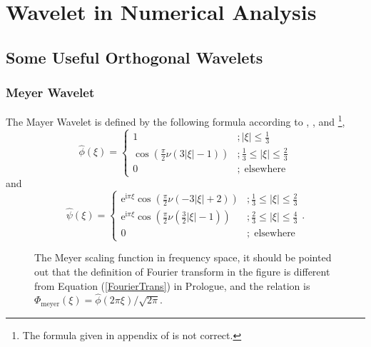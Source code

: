 \documentclass{book}
\newcommand{\mathe}{\mathrm{e}}
\newcommand{\mathi}{\mathrm{i}}
\newcommand{\mathpi}{\pi}
\newcommand{\tmop}[1]{\ensuremath{\operatorname{#1}}}
\begin{document}
\chapter{Wavelet in Numerical Analysis}

\section{Some Useful Orthogonal Wavelets}

\subsection{Meyer Wavelet}

The Mayer Wavelet is defined by the following formula according to
{\cite{frohlich1993adaptive}}, {\cite{daubechies1992ten}}, and
{\cite{vermehren2015close}}\footnote{The formula given in appendix of
{\cite{frohlich1993adaptive}} is not correct.},
\[ \hat{\phi} (\xi) = \left\{ \begin{array}{ll}
     1 & ; | \xi | \leqslant \frac{1}{3}\\
     \cos \left( \frac{\mathpi}{2} \nu (3 | \xi | - 1) \right) & ; \frac{1}{3}
     \leqslant | \xi | \leqslant \frac{2}{3}\\
     0 & ; \tmop{elsewhere}
   \end{array} \right. \]
and
\[ \hat{\psi} (\xi) = \left\{ \begin{array}{ll}
     \mathe^{\mathi \mathpi \xi} \cos \left( \frac{\mathpi}{2} \nu (- 3 | \xi
     | + 2) \right) & ; \frac{1}{3} \leqslant | \xi | \leqslant \frac{2}{3}\\
     \mathe^{\mathi \mathpi \xi} \cos \left( \frac{\mathpi}{2} \nu \left(
     \frac{3}{2} | \xi | - 1 \right) \right) & ; \frac{2}{3} \leqslant | \xi |
     \leqslant \frac{4}{3}\\
     0 & ; \tmop{elsewhere}
   \end{array} \right. . \]
\begin{figure}[h]
  \caption{\label{fig:MeyerScalingSpectrum}The Meyer scaling function in
  frequency space, it should be pointed out that the definition of Fourier
  transform in the figure is different from Equation (\ref{FourierTrans}) in
  Prologue, and the relation is $\Phi_{\tmop{meyer}} (\xi) = \hat{\phi} (2 \pi
  \xi) / \sqrt{2 \mathpi}$.}
\end{figure}
\end{document}
